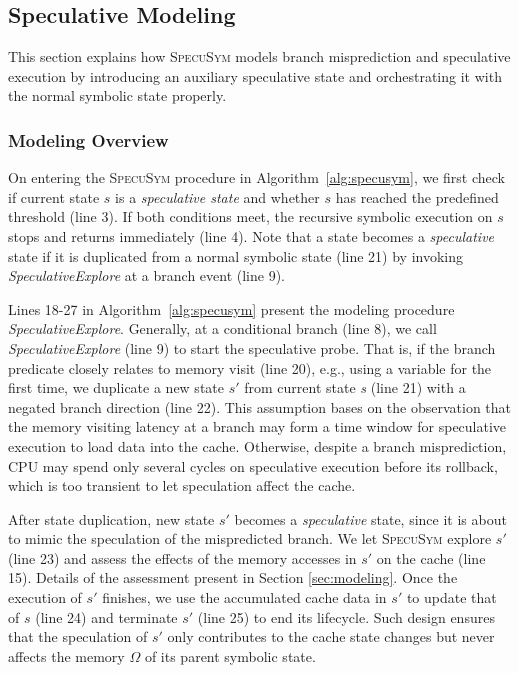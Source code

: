 \documentclass[sigconf]{acmart}
\newcommand{\SpecuSym}{\textsc{SpecuSym} }
\begin{document}
\subsection{Speculative Modeling}
\label{sec:spec_modeling}

This section explains how \SpecuSym models branch misprediction and
speculative execution by introducing an auxiliary speculative state and 
orchestrating it with the normal symbolic state properly.

\subsubsection{Modeling Overview}
On entering the \SpecuSym procedure in Algorithm~\ref{alg:specusym}, we
first check if current state $s$ is a \textit{speculative state} and 
whether $s$ has reached the predefined threshold (line 3). If both 
conditions meet, the recursive symbolic execution on $s$ stops and returns 
immediately (line 4). Note that a state becomes a \textit{speculative} 
state if it is duplicated from a normal symbolic state (line 21) by invoking 
\textit{SpeculativeExplore} at a branch event (line 9). 


Lines 18-27 in Algorithm~\ref{alg:specusym} present the modeling procedure 
\textit{SpeculativeExplore}. Generally, at a conditional branch (line 8), 
we call \textit{SpeculativeExplore} (line 9) to start the speculative probe. 
That is, if the branch predicate closely relates to memory visit (line 20), 
e.g., using a variable for the first time, we duplicate a new state $s'$ 
from current state \textit{s} (line 21) with a negated branch direction 
(line 22). This assumption bases on the observation that the memory visiting 
latency at a branch may form a time window for speculative execution to load 
data into the cache. Otherwise, despite a branch misprediction, CPU may spend 
only several cycles on speculative execution before its rollback, which is too 
transient to let speculation affect the cache.


After state duplication, new state ${s'}$ becomes a \textit{speculative} state, 
since it is about to mimic the speculation of the mispredicted branch. We let 
\SpecuSym explore $s'$ (line 23) and assess the effects of the memory accesses 
in $s'$ on the cache (line 15). Details of the assessment present in Section
\ref{sec:modeling}. Once the execution of $s'$ finishes, we use the accumulated 
cache data in $s'$ to update that of $s$ (line 24) and terminate $s'$ (line 25) 
to end its lifecycle. Such design ensures that the speculation of $s'$ only 
contributes to the cache state changes but never affects the memory $\Omega$ of 
its parent symbolic state.
\end{document}
